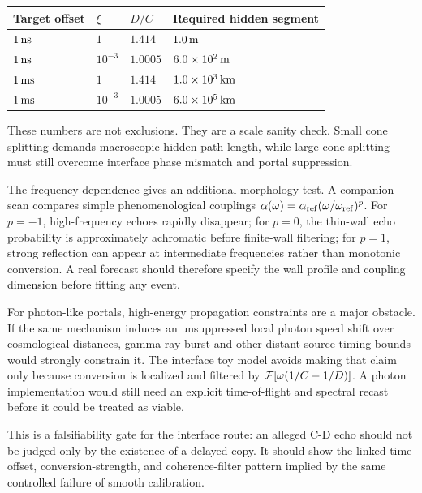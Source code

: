 \documentclass[11pt]{article}
\begin{document}
\begin{center}
\small
\begin{tabularx}{\textwidth}{@{}>{\raggedright\arraybackslash}p{} >{\raggedright\arraybackslash}p{} >{\raggedright\arraybackslash}p{} >{\raggedright\arraybackslash}p{}@{}}
\toprule
Target offset & \(\xi\) & \(D/C\) & Required hidden segment \\
\midrule
\(1\,{\rm ns}\) & \(1\) & \(1.414\) & \(1.0\,{\rm m}\) \\
\(1\,{\rm ns}\) & \(10^{-3}\) & \(1.0005\) & \(6.0\times10^2\,{\rm m}\) \\
\(1\,{\rm ms}\) & \(1\) & \(1.414\) & \(1.0\times10^3\,{\rm km}\) \\
\(1\,{\rm ms}\) & \(10^{-3}\) & \(1.0005\) & \(6.0\times10^5\,{\rm km}\) \\
\bottomrule
\end{tabularx}
\end{center}


These numbers are not exclusions. They are a scale sanity check. Small cone splitting demands macroscopic hidden path length, while large cone splitting must still overcome interface phase mismatch and portal suppression.


The frequency dependence gives an additional morphology test. A companion scan compares simple phenomenological couplings \(\alpha(\omega)=\alpha_{\rm ref}(\omega/\omega_{\rm ref})^p\). For \(p=-1\), high-frequency echoes rapidly disappear; for \(p=0\), the thin-wall echo probability is approximately achromatic before finite-wall filtering; for \(p=1\), strong reflection can appear at intermediate frequencies rather than monotonic conversion. A real forecast should therefore specify the wall profile and coupling dimension before fitting any event.


For photon-like portals, high-energy propagation constraints are a major obstacle. If the same mechanism induces an unsuppressed local photon speed shift over cosmological distances, gamma-ray burst and other distant-source timing bounds would strongly constrain it. The interface toy model avoids making that claim only because conversion is localized and filtered by \({\cal F}[\omega(1/C-1/D)]\). A photon implementation would still need an explicit time-of-flight and spectral recast before it could be treated as viable.


This is a falsifiability gate for the interface route: an alleged C-D echo should not be judged only by the existence of a delayed copy. It should show the linked time-offset, conversion-strength, and coherence-filter pattern implied by the same controlled failure of smooth calibration.
\end{document}
